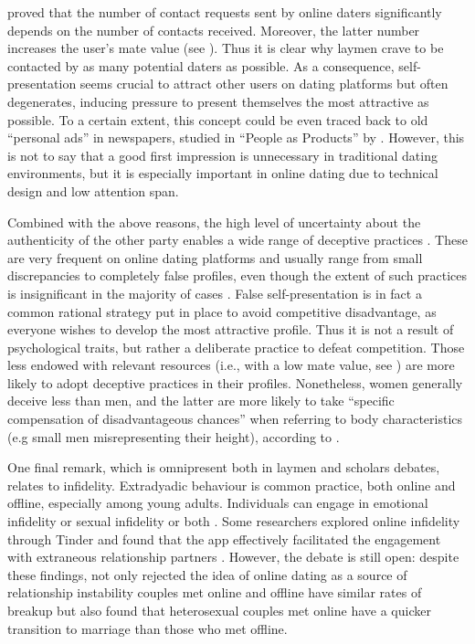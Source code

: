 \citet{Fiore2004Romantic-Regres} proved that the number of contact
requests sent by online daters significantly depends on the number
of contacts received. Moreover, the latter number increases the user's
mate value (see ). Thus it is
clear why laymen crave to be contacted by as many potential daters
as possible. As a consequence, self-presentation seems crucial to
attract other users on dating platforms but often degenerates, inducing
pressure to present themselves the most attractive as possible. To
a certain extent, this concept could be even traced back to old \textquotedblleft personal
ads\textquotedblright{} in newspapers, studied in \textquotedblleft People
as Products\textquotedblright{} by \citep{Hirschman1987People-as-Produ}.
However, this is not to say that a good first impression is unnecessary
in traditional dating environments, but it is especially important
in online dating due to technical design and low attention span.

Combined with the above reasons, the high level of uncertainty about
the authenticity of the other party enables a wide range of deceptive
practices \citep{Wang2007Cyberdating:-Mi}. These are very frequent
on online dating platforms and usually range from small discrepancies
to completely false profiles, even though the extent of such practices
is insignificant in the majority of cases \citep{Hancock2007The-Truth-about}.
False self-presentation is in fact a common rational strategy put
in place to avoid competitive disadvantage, as everyone wishes to
develop the most attractive profile. Thus it is not a result of psychological
traits, but rather a deliberate practice to defeat competition. Those
less endowed with relevant resources (i.e., with a low mate value,
see ) are more likely to adopt
deceptive practices in their profiles. Nonetheless, women generally
deceive less than men, and the latter are more likely to take \textquotedblleft specific
compensation of disadvantageous chances\textquotedblright{} when referring
to body characteristics (e.g small men misrepresenting their height),
according to \citet{Zillmann2011Liars-have-shor}.

One final remark, which is omnipresent both in laymen and scholars
debates, relates to infidelity. Extradyadic behaviour is common practice,
both online and offline, especially among young adults. Individuals
can engage in emotional infidelity or sexual infidelity \textendash{}
or both \citep{Blow2005Infidelity-in-c}. Some researchers explored
online infidelity through Tinder and found that the app effectively
facilitated the engagement with extraneous relationship partners \citep{Weiser2017Swiping-right:-}.
However, the debate is still open: despite these findings, \citet{Rosenfeld2017Marriage-Choice}
not only rejected the idea of online dating as a source of relationship
instability \textendash{} couples met online and offline have similar
rates of breakup \textendash{} but also found that heterosexual couples
met online have a quicker transition to marriage than those who met
offline. 

